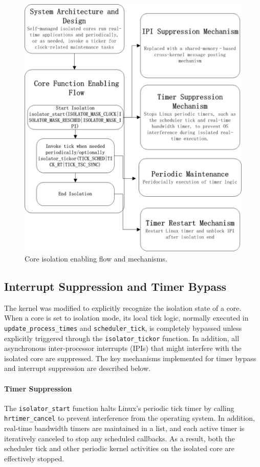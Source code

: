 \documentclass[letterpaper]{article}
\begin{document}
\begin{figure}[htbp]
    \centering
    \includegraphics[width=0.9\linewidth]{Isolator.jpg}
    \caption{Core isolation enabling flow and mechanisms.}
    \label{fig:isolator_flow}
\end{figure}


\subsection{Interrupt Suppression and Timer Bypass}
\label{subsec:interrupt-timer}

The kernel was modified to explicitly recognize the isolation state of a core.
When a core is set to isolation mode, its local tick logic, normally executed in
\texttt{update\_process\_times} and \texttt{scheduler\_tick},
is completely bypassed unless explicitly triggered through the \texttt{isolator\_tickor} function.
In addition, all asynchronous inter-processor interrupts (IPIs) that might interfere with the
isolated core are suppressed. The key mechanisms implemented for timer bypass and interrupt suppression are described below.

\paragraph{Timer Suppression}  
The \texttt{isolator\_start} function halts Linux’s periodic tick timer by calling \texttt{hrtimer\_cancel} to
prevent interference from the operating system. In addition, real-time bandwidth timers are maintained in a list,
and each active timer is iteratively canceled to stop any scheduled callbacks. As a result, both the scheduler tick
and other periodic kernel activities on the isolated core are effectively stopped.
\end{document}
